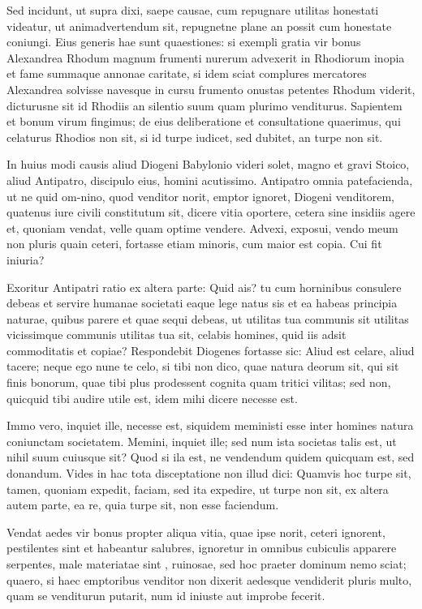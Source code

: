  Sed incidunt, ut supra dixi, saepe causae, cum repugnare utilitas honestati videatur, ut animadvertendum sit, repugnetne plane an possit cum honestate coniungi. Eius generis hae sunt quaestiones: si exempli gratia vir bonus Alexandrea Rhodum magnum frumenti nurerum advexerit in Rhodiorum inopia et fame summaque annonae caritate, si idem sciat complures mercatores Alexandrea solvisse navesque in cursu frumento onustas petentes Rhodum viderit, dicturusne sit id Rhodiis an silentio suum quam plurimo venditurus. Sapientem et bonum virum fingimus; de eius deliberatione et consultatione quaerimus, qui celaturus Rhodios non sit, si id turpe iudicet, sed dubitet, an turpe non sit.

 In huius modi causis aliud Diogeni Babylonio videri solet, magno et gravi Stoico, aliud Antipatro, discipulo eius, homini acutissimo. Antipatro omnia patefacienda, ut ne quid om-nino, quod venditor norit, emptor ignoret, Diogeni venditorem, quatenus iure civili constitutum sit, dicere vitia oportere, cetera sine insidiis agere et, quoniam vendat, velle quam optime vendere. Advexi, exposui, vendo meum non pluris quain ceteri, fortasse etiam minoris, cum maior est copia. Cui fit iniuria?

 Exoritur Antipatri ratio ex altera parte: Quid ais? tu cum horninibus consulere debeas et servire humanae societati eaque lege natus sis et ea habeas principia naturae, quibus parere et quae sequi debeas, ut utilitas tua communis sit utilitas vicissimque communis utilitas tua sit, celabis homines, quid iis adsit commoditatis et copiae? Respondebit Diogenes fortasse sic: Aliud est celare, aliud tacere; neque ego nune te celo, si tibi non dico, quae natura deorum sit, qui sit finis bonorum, quae tibi plus prodessent cognita quam tritici vilitas; sed non, quicquid tibi audire utile est, idem mihi dicere necesse est.

 Immo vero, inquiet ille, necesse est, siquidem meministi esse inter homines natura coniunctam societatem. Memini, inquiet ille; sed num ista societas talis est, ut nihil suum cuiusque sit? Quod si ila est, ne vendendum quidem quicquam est, sed donandum. Vides in hac tota disceptatione non illud dici: Quamvis hoc turpe sit, tamen, quoniam expedit, faciam, sed ita expedire, ut turpe non sit, ex altera autem parte, ea re, quia turpe sit, non esse faciendum.

 Vendat aedes vir bonus propter aliqua vitia, quae ipse norit, ceteri ignorent, pestilentes sint et habeantur salubres, ignoretur in omnibus cubiculis apparere serpentes, male materiatae sint , ruinosae, sed hoc praeter dominum nemo sciat; quaero, si haec emptoribus venditor non dixerit aedesque vendiderit pluris multo, quam se venditurun putarit, num id iniuste aut improbe fecerit.

